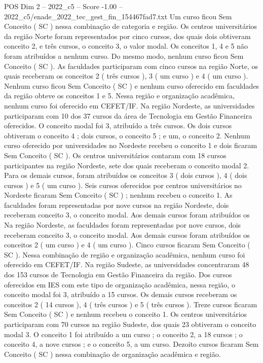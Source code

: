 \begin{textsample}{POS Dim 2 – 2022\_c5 – Score -1.00 – 2022\_c5/enade\_2022\_tec\_gest\_fin\_154467fad7.txt}
Um curso ficou Sem Conceito ( SC ) nessa combinação de categoria e região.
Os centros universitários da região Norte foram representados por cinco cursos, dos quais dois obtiveram conceito 2, e três cursos, o conceito 3, o valor modal.
Os conceitos 1, 4 e 5 não foram atribuídos a nenhum curso.
Do mesmo modo, nenhum curso ficou Sem Conceito ( SC ).
As faculdades participaram com cinco cursos na região Norte, os quais receberam os conceitos 2 ( três cursos ), 3 ( um curso ) e 4 ( um curso ).
Nenhum curso ficou Sem Conceito ( SC ) e nenhum curso oferecido em faculdades da região obteve os conceitos 1 e 5.
Nessa região e organização acadêmica, nenhum curso foi oferecido em CEFET/IF.
Na região Nordeste, as universidades participaram com 10 dos 37 cursos da área de Tecnologia em Gestão Financeira oferecidos.
O conceito modal foi 3, atribuído a três cursos.
Os dois cursos obtiveram o conceito 4 ; dois cursos, o conceito 5 ; e um, o conceito 2.
Nenhum curso oferecido por universidades no Nordeste recebeu o conceito 1 e dois ficaram Sem Conceito ( SC ).
Os centros universitários contaram com 18 cursos participantes na região Nordeste, sete dos quais receberam o conceito modal 2.
Para os demais cursos, foram atribuídos os conceitos 3 ( dois cursos ), 4 ( dois cursos ) e 5 ( um curso ).
Seis cursos oferecidos por centros universitários no Nordeste ficaram Sem Conceito ( SC ) ; nenhum recebeu o conceito 1.
As faculdades foram representadas por nove cursos na região Nordeste, dois receberam conceito 3, o conceito modal.
Aos demais cursos foram atribuídos os Na região Nordeste, as faculdades foram representadas por nove cursos, dois receberam conceito 3, o conceito modal.
Aos demais cursos foram atribuídos os conceitos 2 ( um curso ) e 4 ( um curso ).
Cinco cursos ficaram Sem Conceito ( SC ).
Nessa combinação de região e organização acadêmica, nenhum curso foi oferecido em CEFET/IF.
Na região Sudeste, as universidades concentraram 48 dos 153 cursos de Tecnologia em Gestão Financeira da região.
Dos cursos oferecidos em IES com este tipo de organização acadêmica, nessa região, o conceito modal foi 3, atribuído a 15 cursos.
Os demais cursos receberam os conceitos 2 ( 14 cursos ), 4 ( três cursos ) e 5 ( três cursos ).
Treze cursos ficaram Sem Conceito ( SC ) e nenhum recebeu o conceito 1.
Os centros universitários participaram com 70 cursos na região Sudeste, dos quais 23 obtiveram o conceito modal 3.
O conceito 1 foi atribuído a um curso ; o conceito 2, a 18 cursos ; o conceito 4, a nove cursos ; e o conceito 5, a um curso.
Dezoito cursos ficaram Sem Conceito ( SC ) nessa combinação de organização acadêmica e região.

\end{textsample}
